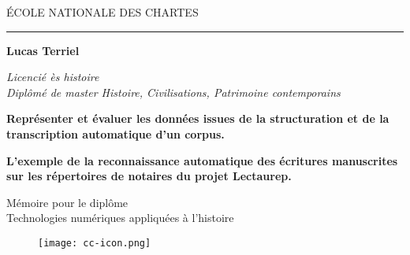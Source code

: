 \begin{titlepage}
    \begin{center}

        \bigskip
    
        \begin{large}
            \'ECOLE NATIONALE DES CHARTES 
        \end{large}
    
        \begin{center}
            \rule{4cm}{0.02cm}
        \end{center}
    
        \hugeskip
        
        \begin{Large}
             \textbf{Lucas Terriel}\\
        \end{Large}
        \begin{normalsize}
            \textit{Licencié ès histoire}\\
            \textit{Diplômé de master 
            Histoire, Civilisations, Patrimoine contemporains}\\
        \end{normalsize}
        
        \hugeskip
        \bigskip
        
        \begin{LARGE}
            \textbf{Représenter et évaluer les données issues de la structuration et de la transcription automatique d'un corpus.}
            
        \end{LARGE}
        \bigskip
        \bigskip
        \bigskip
        \bigskip
        \begin{large}
            \textbf{L'exemple de la reconnaissance automatique des écritures manuscrites sur les répertoires de notaires du projet Lectaurep.}\\
        \end{large}
        
        \hugeskip
        \vfill
        
        
        
        \begin{large}
            Mémoire pour le diplôme\\
            \og Technologies numériques appliquées à l'histoire \fg\\
        \end{large}
        
        \begin{figure}[H]
            \centering
            \texttt{[image: cc-icon.png]}
            \label{traitement}
        \end{figure}
        
    \end{center}
\end{titlepage}

\thispagestyle{empty}
\cleardoublepage